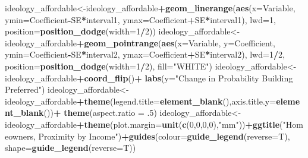 \documentclass[]{article}
\newenvironment{Shaded}{\begin{snugshade}}{\end{snugshade}}
\newcommand{\DataTypeTok}[1]{\textcolor[rgb]{0.13,0.29,0.53}{#1}}
\newcommand{\DecValTok}[1]{\textcolor[rgb]{0.00,0.00,0.81}{#1}}
\newcommand{\FloatTok}[1]{\textcolor[rgb]{0.00,0.00,0.81}{#1}}
\newcommand{\KeywordTok}[1]{\textcolor[rgb]{0.13,0.29,0.53}{\textbf{#1}}}
\newcommand{\NormalTok}[1]{#1}
\newcommand{\OperatorTok}[1]{\textcolor[rgb]{0.81,0.36,0.00}{\textbf{#1}}}
\newcommand{\StringTok}[1]{\textcolor[rgb]{0.31,0.60,0.02}{#1}}
\begin{document}
\begin{Shaded}
\begin{Highlighting}[]
{{{\NormalTok{ideology_affordable<-ideology_affordable}\OperatorTok{+}\KeywordTok{geom_linerange}\NormalTok{(}\KeywordTok{aes}\NormalTok{(}\DataTypeTok{x=}\NormalTok{Variable, }\DataTypeTok{ymin=}\NormalTok{Coefficient}\OperatorTok{-}\NormalTok{SE}\OperatorTok{*}\NormalTok{interval1, }
                                                            \DataTypeTok{ymax=}\NormalTok{Coefficient}\OperatorTok{+}\NormalTok{SE}\OperatorTok{*}\NormalTok{interval1), }\DataTypeTok{lwd=}\DecValTok{1}\NormalTok{, }\DataTypeTok{position=}\KeywordTok{position_dodge}\NormalTok{(}\DataTypeTok{width=}\DecValTok{1}\OperatorTok{/}\DecValTok{2}\NormalTok{))}
\NormalTok{ideology_affordable<-ideology_affordable}\OperatorTok{+}\KeywordTok{geom_pointrange}\NormalTok{(}\KeywordTok{aes}\NormalTok{(}\DataTypeTok{x=}\NormalTok{Variable, }\DataTypeTok{y=}\NormalTok{Coefficient, }\DataTypeTok{ymin=}\NormalTok{Coefficient}\OperatorTok{-}\NormalTok{SE}\OperatorTok{*}\NormalTok{interval2,}
                                                             \DataTypeTok{ymax=}\NormalTok{Coefficient}\OperatorTok{+}\NormalTok{SE}\OperatorTok{*}\NormalTok{interval2), }\DataTypeTok{lwd=}\DecValTok{1}\OperatorTok{/}\DecValTok{2}\NormalTok{,}
                                                         \DataTypeTok{position=}\KeywordTok{position_dodge}\NormalTok{(}\DataTypeTok{width=}\DecValTok{1}\OperatorTok{/}\DecValTok{2}\NormalTok{),  }\DataTypeTok{fill=}\StringTok{"WHITE"}\NormalTok{)}
\NormalTok{ideology_affordable<-ideology_affordable}\OperatorTok{+}\KeywordTok{coord_flip}\NormalTok{()}\OperatorTok{+}\StringTok{ }\KeywordTok{labs}\NormalTok{(}\DataTypeTok{y=}\StringTok{"Change in Probability Building Preferred"}\NormalTok{)}
\NormalTok{ideology_affordable<-ideology_affordable}\OperatorTok{+}\KeywordTok{theme}\NormalTok{(}\DataTypeTok{legend.title=}\KeywordTok{element_blank}\NormalTok{(),}\DataTypeTok{axis.title.y=}\KeywordTok{element_blank}\NormalTok{())}\OperatorTok{+}\StringTok{ }\KeywordTok{theme}\NormalTok{(}\DataTypeTok{aspect.ratio =} \FloatTok{.5}\NormalTok{)}
\NormalTok{ideology_affordable<-ideology_affordable}\OperatorTok{+}\KeywordTok{theme}\NormalTok{(}\DataTypeTok{plot.margin=}\KeywordTok{unit}\NormalTok{(}\KeywordTok{c}\NormalTok{(}\DecValTok{0}\NormalTok{,}\DecValTok{0}\NormalTok{,}\DecValTok{0}\NormalTok{,}\DecValTok{0}\NormalTok{),}\StringTok{"mm"}\NormalTok{))}\OperatorTok{+}\KeywordTok{ggtitle}\NormalTok{(}\StringTok{"Homeowners, Proximity by Income"}\NormalTok{)}\OperatorTok{+}\KeywordTok{guides}\NormalTok{(}\DataTypeTok{colour=}\KeywordTok{guide_legend}\NormalTok{(}\DataTypeTok{reverse=}\NormalTok{T), }\DataTypeTok{shape=}\KeywordTok{guide_legend}\NormalTok{(}\DataTypeTok{reverse=}\NormalTok{T))}


}}}
\end{Highlighting}
\end{Shaded}
\end{document}
